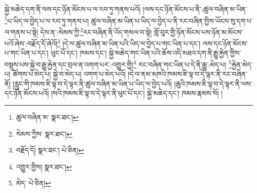 སྐྱེ་མཆེད་དག་ནི་ལས་དང་ཉོན་མོངས་པ་ལ་རབ་ཏུ་གནས་པའོ། །ལས་དང་ཉོན་མོངས་པ་ནི་:ཚུལ་བཞིན་མ་ཡིན་\footnote{ཚུལ་བཞིན་མ་  སྣར་ཐང་། }པ་ཡིད་ལ་བྱེད་པ་ལ་རབ་ཏུ་གནས་པ། ཚུལ་བཞིན་མ་ཡིན་པ་ཡིད་ལ་བྱེད་པ་ནི་རང་བཞིན་གྱིས་ཡོངས་སུ་དག་པ་ལ་གནས་པ་སྟེ། དེས་ན་:སེམས་ཀྱི་\footnote{སེམས་ཀྱིས་  སྣར་ཐང་། }རང་བཞིན་ནི་འོད་གསལ་བ་སྟེ། གློ་བུར་གྱི་ཉོན་མོངས་པས་ཉོན་མ་མོངས་པའོ་ཞེས་:བརྗོད་དོ་ཞེའོ།\footnote{བརྗོད་དོ།  སྣར་ཐང་།  པེ་ཅིན། } །དེ་ལ་ཚུལ་བཞིན་མ་ཡིན་པའི་ཡིད་ལ་བྱེད་པ་གང་ཡིན་པ་དང་། ལས་དང་ཉོན་མོངས་པ་གང་ཡིན་པ་དང་། ཕུང་པོ་དང་། ཁམས་དང་། སྐྱེ་མཆེད་གང་ཡིན་པའི་ཆོས་འདི་མཐའ་དག་ནི་རྒྱུ་རྐྱེན་གྱིས་བསྡུས་པས་སྐྱེ་བ་རྒྱུ་རྐྱེན་དང་བྲལ་ན་འགག་པར་:འགྱུར་གྱི།\footnote{འགྱུར་གྱིས།  སྣར་ཐང་། } རང་བཞིན་གང་ཡིན་པ་དེ་ནི་རྒྱུ་:མེད་པ། \footnote{མེད་  པེ་ཅིན། }རྐྱེན་མེད་པ། ཚོགས་པ་མེད་པ། སྐྱེ་བ་མེད་པ། འགག་པ་མེད་པའོ། །དེ་ལ་ནམ་མཁའི་ཁམས་ཇི་ལྟ་བ་དེ་ལྟར་ནི་རང་བཞིན་ནོ། །རླུང་གི་ཁམས་ཇི་ལྟ་བ་དེ་ལྟར་ནི་ཚུལ་བཞིན་མ་ཡིན་པ་ཡིད་ལ་བྱེད་པའོ། །ཆུའི་ཁམས་ཇི་ལྟ་བ་དེ་ལྟར་ནི་ལས་དང་ཉོན་མོངས་པའོ། །སའི་ཁམས་ཇི་ལྟ་བ་དེ་ལྟར་ནི་ཕུང་པོ་དང་། སྐྱེ་མཆེད་དང་། ཁམས་རྣམས་སོ། །
